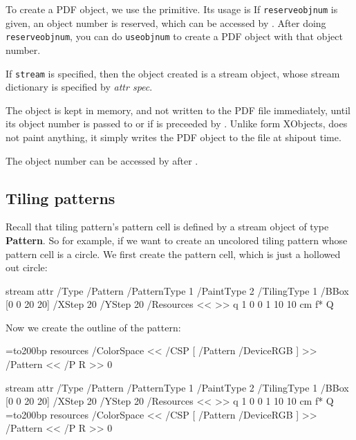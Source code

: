 To create a PDF object, we use the \macro\pdfobj{} primitive.
Its usage is
\noindent If {\tt reserveobjnum} is given, an object number is reserved, which can be accessed by
\macro\pdflastobj.
After doing {\tt reserveobjnum}, you can do {\tt useobjnum} to create a PDF object with that object number.

If {\tt stream} is specified, then the object created is a stream object, whose stream dictionary is specified
by {\it attr spec}.

The object is kept in memory, and not written to the PDF file immediately, until its object number is passed
to \macro\pdfrefobj{} or if \macro\pdfobj{} is preceeded by \macro\immediate.
Unlike form XObjects, \macro\pdfrefobj{} does not paint anything, it simply writes the PDF object to the file
at shipout time.

The object number can be accessed by \macro\pdflastobj{} after \macro\pdfobj.

\subsection{Tiling patterns}

Recall that tiling pattern's pattern cell is defined by a stream object of type {\bf Pattern}.
So for example, if we want to create an uncolored tiling pattern whose pattern cell is a circle.
We first create the pattern cell, which is just a hollowed out circle:

\blisting
\immediate\pdfobj stream attr{
    /Type /Pattern
    /PatternType 1
    /PaintType 2
    /TilingType 1
    /BBox [0 0 20 20] 
    /XStep 20
    /YStep 20
    /Resources << >>
}{
    q
    1 0 0 1 10 10 cm
     f*
    Q
}
\elisting

Now we create the outline of the pattern:

\blisting
\bgroup{}=\hbox to200bp{\vrule width0bp height200bp depth0bp%
\hfil}
\pdfxform resources{
    /ColorSpace << /CSP [ /Pattern /DeviceRGB ] >>
    /Pattern << /P \the\pdflastobj{} R >>
}0
\xdef\donutdonut{\pdfrefxform\the\pdflastxform\relax}
\egroup
\elisting

\immediate\pdfobj stream attr{
    /Type /Pattern
    /PatternType 1
    /PaintType 2
    /TilingType 1
    /BBox [0 0 20 20] 
    /XStep 20
    /YStep 20
    /Resources << >>
}{
    q
    1 0 0 1 10 10 cm
     f*
    Q
}
\bgroup{}=\hbox to200bp{\vrule width0bp height200bp depth0bp%
\hfil}
\pdfxform resources{%
    /ColorSpace << /CSP [ /Pattern /DeviceRGB ] >>
    /Pattern << /P \the\pdflastobj{} R >>
}0
\xdef\donutdonut{\pdfrefxform\the\pdflastxform\relax}
\egroup

